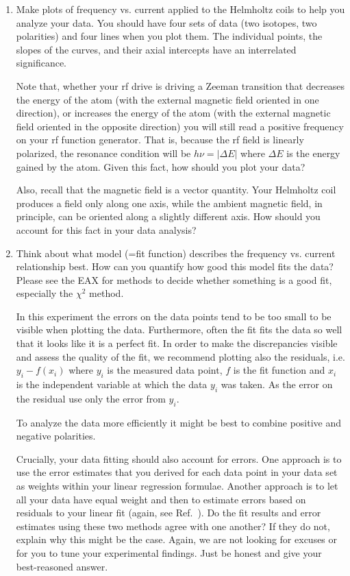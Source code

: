 \documentclass{../lab}
\begin{document}
\begin{enumerate}
    \item Make plots of frequency vs. current applied to the Helmholtz coils to help you analyze your data. You should have four sets of data (two isotopes, two polarities) and four lines when you plot them. The individual points, the slopes of the curves, and their axial intercepts have an interrelated significance.
    
    Note that, whether your rf drive is driving a Zeeman transition that decreases the energy of the atom (with the external magnetic field oriented in one direction), or increases the energy of the atom (with the external magnetic field oriented in the opposite direction) you will still read a positive frequency on your rf function generator.  That is, because the rf field is linearly polarized, the resonance condition will be $h \nu = |\Delta E|$ where $\Delta E$ is the energy gained by the atom.  Given this fact, how should you plot your data?
    
    Also, recall that the magnetic field is a vector quantity.  Your Helmholtz coil produces a field only along one axis, while the ambient magnetic field, in principle, can be oriented along a slightly different axis.  How should you account for this fact in your data analysis?
    
     \item Think about what model (=fit function) describes the frequency vs. current relationship best. How can you quantify how good this model fits the data? Please see the EAX for methods to decide whether something is a good fit, especially the $\chi^2$ method. 
     
     In this experiment the errors on the data points tend to be too small to be visible when plotting the data. Furthermore, often the fit fits the data so well that it looks like it is a perfect fit. In order to make the discrepancies visible and assess the quality of the fit, we recommend plotting also the residuals, i.e. $y_i-f(x_i)$ where $y_i$ is the measured data point, $f$ is the fit function and $x_i$ is the independent variable at which the data $y_i$ was taken. As the error on the residual use only the error from $y_i$.  
     
     To analyze the data more efficiently it might be best to combine positive and negative polarities.  
     
     Crucially, your data fitting should also account for errors.  One approach is to use the error estimates that you derived for each data point in your data set as weights within your linear regression formulae.  Another approach is to let all your data have equal weight and then to estimate errors based on residuals to your linear fit (again, see Ref.\ \cite{Lyons}).  Do the fit results and error estimates using these two methods agree with one another?  If they do not, explain why this might be the case.  Again, we are not looking for excuses or for you to tune your experimental findings.  Just be honest and give your best-reasoned answer.
     


\end{enumerate}
\end{document}
